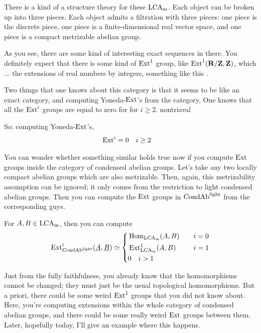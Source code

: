 There is a kind of a structure theory for these $\mathrm{LCA_m}$. Each object can be broken up into three pieces. Each object admits a filtration with three pieces: one piece is the discrete piece, one piece is a finite-dimensional real vector space, and one piece is a compact metrizable abelian group. 

As you see, there are some kind of interesting exact sequences in there. You definitely expect that there is some kind of $\operatorname{Ext}^1$ group, like $\operatorname{Ext}^1(\mathbf R/\mathbf Z,\mathbf Z)$, which ... the extensions of real numbers by integers, something like this .

Two things that one knows about this category is that it seems to be like an exact category, and computing Yoneda-$\operatorname{Ext}$'s from the category, 
One knows that all the $\operatorname{Ext}^i$ groups are equal to zero for for $i \geq 2$.
nontriaval

So: computing Yoneda-$\operatorname{Ext}$'s,
\begin{align*}
\operatorname{Ext}^i = 0 \quad & i \geq 2
\end{align*}

You can wonder whether something similar holds true now if you compute $\operatorname{Ext}$ groups inside the category of condensed abelian groups. Let's take any two locally compact abelian groups which are also metrizable. Then, again, this metrizability assumption can be ignored; it only comes from the restriction to light condensed abelian groups. Then you can compute the $\operatorname{Ext}$ groups in $\mathrm{Cond}\mathrm{Ab}^{\mathrm{light}}$ from the corresponding guys.

\begin{theorem}
For $A, B \in \mathrm{LCA_m}$, then you can compute  
\begin{align*}
\operatorname{Ext}^i_{\mathrm{Cond}\mathrm{Ab}^{\mathrm{light}}}( \underline{A}, \underline{B} ) \simeq 
\left\{
    \begin{aligned}
         & \operatorname{Hom}_{\mathrm{LCA_m}} (A,B) \quad & i = 0 \\
         & \operatorname{Ext}^1_{\mathrm{LCA_m}} (A,B) \quad & i = 1 \\
		 & 0 \quad i > 1
    \end{aligned}
\right.
\end{align*}
\end{theorem}

Just from the fully faithfulness, you already know that the homomorphisms cannot be changed; they must just be the usual topological homomorphisms. 
But a priori, there could be some weird $\operatorname{Ext}^1$ groups that you did not know about. Here, you're computing extensions within the whole category of condensed abelian groups, and there could be some really weird $\operatorname{Ext}$ groups between them. Later, hopefully today, I'll give an example where this happens.

